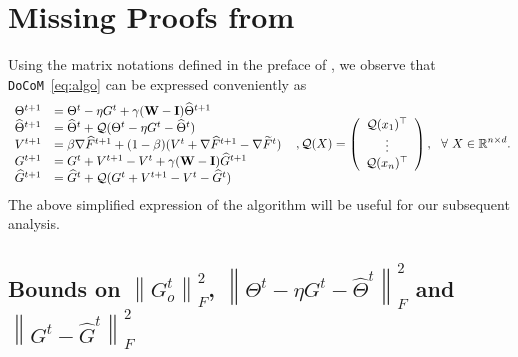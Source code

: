 \documentclass[10pt]{article} %
\theoremstyle{plain}
\theoremstyle{definition}
\theoremstyle{remark}
\newcommand{\aname}{{\tt DoCoM}}
\newcommand{\norm}[1]{\left\| #1 \right\|}
\newcommand{\stocgrdF}{\nabla \widehat{F}}
\newcommand{\stocgrdFp}{\nabla \widetilde{F}}
\newcommand{\hatTheta}{\widehat{\Theta}}
\newcommand{\hatG}{\widehat{G}}
\begin{document}



\appendix
\section{Missing Proofs from }
Using the matrix notations defined in the preface of , we observe that \aname~\eqref{eq:algo} can be  expressed conveniently as
\begin{equation*}
\begin{array}{ll}
    \Theta^{t+1} & = \Theta^t - \eta G^t + \gamma ( {\bf W} - {\bf I} ) \hatTheta^{t+1} \\
    \hatTheta^{t+1} & = \hatTheta^t + {\cal Q} ( \Theta^t - \eta G^t - \hatTheta^t ) \\
    V^{t+1} & = \beta \stocgrdF^{t+1} + (1-\beta) ( V^t + \stocgrdF^{t+1} - \stocgrdFp^{t} ) \\
    G^{t+1} & = G^t + V^{t+1} - V^t + \gamma ( {\bf W} - {\bf I} ) \hatG^{t+1} \\
    \hatG^{t+1} & = \hatG^t + {\cal Q} ( G^t + V^{t+1} - V^t - \hatG^t )
\end{array}~~
, {\cal Q}( X ) = \left( 
    \begin{array}{c}
        {\cal Q}( x_1 )^\top \\ 
        \vdots \\
        {\cal Q}( x_n )^\top
    \end{array}
\right),~~\forall~X \in \mathbb{R}^{n \times d}.
\end{equation*}
The above simplified expression of the algorithm will be useful for our subsequent analysis.

\iffalse 
\subsection{Bounds on $\norm{G_o^t}_F^2$, $\norm{\Theta^t - \eta G^t - \hatTheta^t}_F^2$ and $\norm{ G^{t} - \hatG^{t} }_F^2$} \label{app:control_GoTheta}
\end{document}
